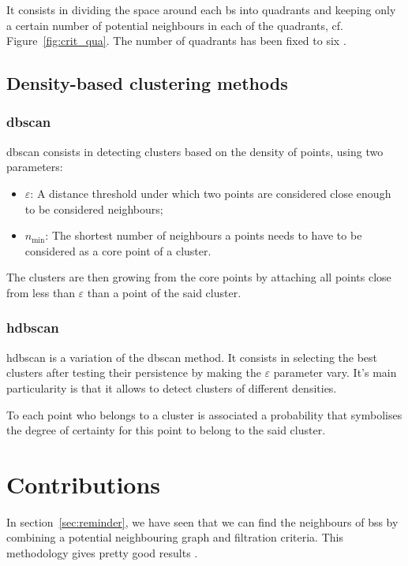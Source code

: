 \documentclass[lettersize,journal,english]{IEEEtran}
\begin{document}
            It consists in dividing the space around each \acrshort{bs} into quadrants and keeping only a certain number of potential neighbours in each of the quadrants, cf. Figure~\ref{fig:crit_qua}.
            The number of quadrants has been fixed to six \cite{art_del_paq}.

    \subsection{Density-based clustering methods}
        \subsubsection{\acrshort{dbscan}}
            \acrshort{dbscan} consists in detecting clusters based on the density of points, using two parameters:
            \begin{itemize}
                \item $\varepsilon$: A distance threshold under which two points are considered close enough to be considered neighbours;   
                \item $n_{\text{min}}$: The shortest number of neighbours a points needs to have to be considered as a core point of a cluster.
            \end{itemize}

            The clusters are then \og growing\fg{} from the core points by attaching all points close from less than $\varepsilon$ than a point of the said cluster.

        \subsubsection{\acrshort{hdbscan}}
            \acrshort{hdbscan} \cite{10.1007/978-3-642-37456-2_14} is a variation of the \acrshort{dbscan} method.
            It consists in selecting the best clusters after testing their persistence by making the $\varepsilon$ parameter vary. It's main particularity is that it allows to detect clusters of different densities.

            To each point who belongs to a cluster is associated a probability that symbolises the degree of certainty for this point to belong to the said cluster.

\section{Contributions\label{sec:contrib}}
    \noindent In section~\ref{sec:reminder}, we have seen that we can find the neighbours of \acrshort{bs}s by combining a potential neighbouring graph and filtration criteria. This methodology gives pretty good results \cite{art_del_paq}.
\end{document}
